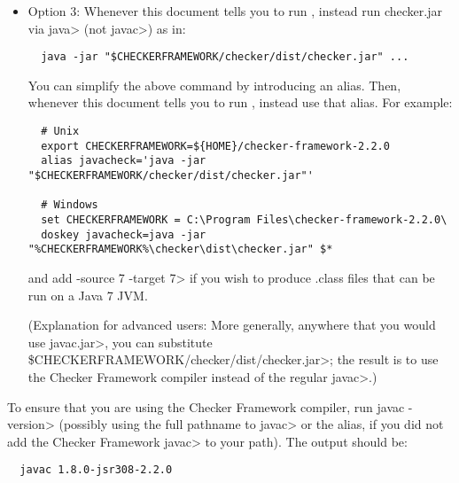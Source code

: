\begin{itemize}
   \item
   Option 3:
   Whenever this document tells you to run , instead
   run checker.jar via \<java> (not \<javac>) as in:

\begin{Verbatim}
  java -jar "$CHECKERFRAMEWORK/checker/dist/checker.jar" ...
\end{Verbatim}

    You can simplify the above command by introducing an alias.  Then,
    whenever this document tells you to run , instead use that
    alias.  For example:

\begin{Verbatim}
  # Unix
  export CHECKERFRAMEWORK=${HOME}/checker-framework-2.2.0
  alias javacheck='java -jar "$CHECKERFRAMEWORK/checker/dist/checker.jar"'

  # Windows
  set CHECKERFRAMEWORK = C:\Program Files\checker-framework-2.2.0\
  doskey javacheck=java -jar "%CHECKERFRAMEWORK%\checker\dist\checker.jar" $*
\end{Verbatim}

   \noindent
   and add \<-source 7 -target 7> if you wish to produce .class files that
   can be run on a Java 7 JVM.

   (Explanation for advanced users:  More generally, anywhere that you would use \<javac.jar>, you can substitute
   \<\$CHECKERFRAMEWORK/checker/dist/checker.jar>;
   the result is to use the Checker
   Framework compiler instead of the regular \<javac>.)

\end{itemize}


To ensure that you are using the Checker Framework compiler, run
\<javac -version> (possibly using the
full pathname to \<javac> or the alias, if you did not add the Checker
Framework \<javac> to your path).
The output should be:

\begin{Verbatim}
  javac 1.8.0-jsr308-2.2.0
\end{Verbatim}




